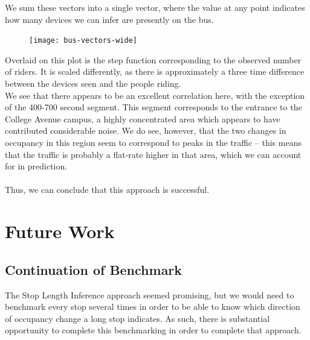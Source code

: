 \documentclass[11pt,journal,compsoc]{IEEEtran} %
\begin{document}
		We sum these vectors into a single vector, where the value at any point indicates how many devices we can infer are presently on the bus.

		\begin{figure}[!t]
		\texttt{[image: bus-vectors-wide]}
		\end{figure}

		Overlaid on this plot is the step function corresponding to the observed number of riders.
		It is scaled differently, as there is approximately a three time difference between the devices seen and the people riding.
		\\
		We see that there appears to be an excellent correlation here, with the exception of the 400-700 second segment. %
		This segment corresponds to the entrance to the College Avenue campus, a highly concentrated area which appears to have contributed considerable noise.
		We do see, however, that the two changes in occupancy in this region seem to correspond to peaks in the traffic -- this means that the traffic is probably a flat-rate higher in that area, which we can account for in prediction.
		\\\\
		Thus, we can conclude that this approach is successful. %


\section{Future Work}
    
\subsection*{Continuation of Benchmark}
	The Stop Length Inference approach seemed promising, but we would need to benchmark every stop several times in order to be able to know which direction of occupancy change a long stop indicates.
    As such, there is substantial opportunity to complete this benchmarking in order to complete that approach.
\end{document}
